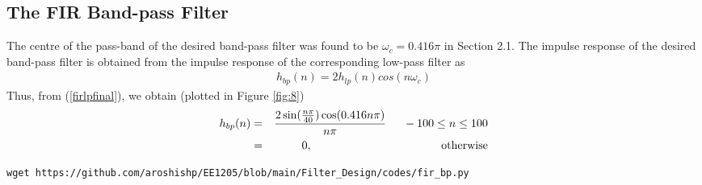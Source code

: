 \documentclass{article}
\begin{document}
\subsection{The FIR Band-pass Filter}
The centre of the pass-band of the desired band-pass filter was found to be $\omega_c = 0.416\pi$ in Section
2.1.  The impulse response of the desired band-pass filter is obtained from the impulse response of the
corresponding low-pass filter as
\begin{eqnarray}
h_{bp}(n) = 2h_{lp}(n)cos(n\omega_c)
\end{eqnarray}
Thus, from (\ref{firlpfinal}), we obtain (plotted in Figure \ref{fig:8})
\begin{eqnarray}
\label{firbpfinal}
h_{bp}(n) &=& \frac{2\sin(\frac{n\pi}{40}) \cos(0.416n\pi)}{n\pi} \indent -100 \leq n \leq 100 \nonumber \\
&=& 0, \hspace{4cm} \mbox{otherwise}
\end{eqnarray}
\begin{lstlisting}[caption = {Code for Figure 8 and 9}]
wget https://github.com/aroshishp/EE1205/blob/main/Filter_Design/codes/fir_bp.py
\end{lstlisting}
\end{document}
